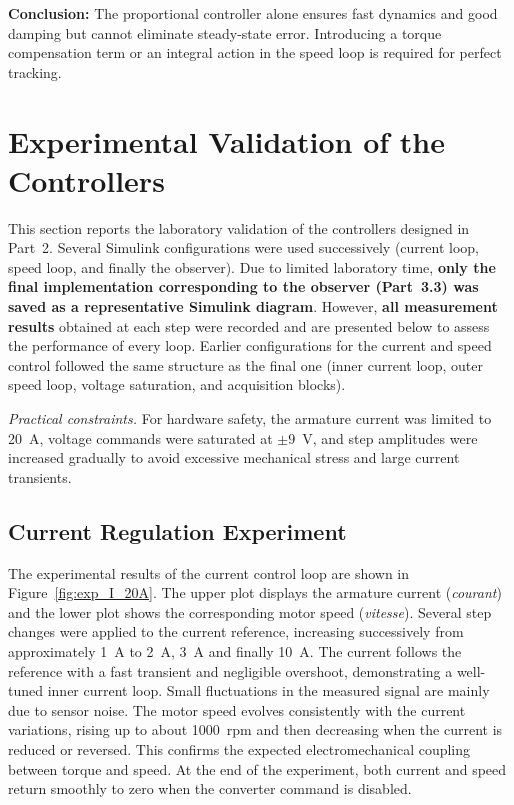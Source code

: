 \documentclass{rapportCS}
\begin{document}
\noindent\textbf{Conclusion:}
The proportional controller alone ensures fast dynamics and good damping but cannot eliminate steady-state error.  
Introducing a torque compensation term or an integral action in the speed loop is required for perfect tracking.

\newpage

\section{Experimental Validation of the Controllers}

\label{sec:exp}

This section reports the laboratory validation of the controllers designed in Part~2. 
Several Simulink configurations were used successively (current loop, speed loop, and finally the observer). 
Due to limited laboratory time, \textbf{only the final implementation corresponding to the observer (Part~3.3) was saved as a representative Simulink diagram}. 
However, \textbf{all measurement results} obtained at each step were recorded and are presented below to assess the performance of every loop. 
Earlier configurations for the current and speed control followed the same structure as the final one (inner current loop, outer speed loop, voltage saturation, and acquisition blocks).

\vspace{4pt}
\noindent\textit{Practical constraints.} For hardware safety, the armature current was limited to 20~A, voltage commands were saturated at $\pm9$~V, and step amplitudes were increased gradually to avoid excessive mechanical stress and large current transients.

\subsection{Current Regulation Experiment}

The experimental results of the current control loop are shown in Figure~\ref{fig:exp_I_20A}. 
The upper plot displays the armature current (\textit{courant}) and the lower plot shows the corresponding motor speed (\textit{vitesse}). 
Several step changes were applied to the current reference, increasing successively from approximately 1~A to 2~A, 3~A and finally 10~A. 
The current follows the reference with a fast transient and negligible overshoot, demonstrating a well-tuned inner current loop. 
Small fluctuations in the measured signal are mainly due to sensor noise. 
The motor speed evolves consistently with the current variations, rising up to about 1000~rpm and then decreasing when the current is reduced or reversed. 
This confirms the expected electromechanical coupling between torque and speed. 
At the end of the experiment, both current and speed return smoothly to zero when the converter command is disabled.
\end{document}
